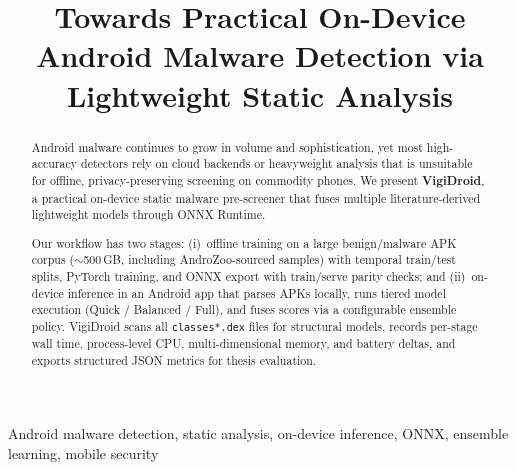 \documentclass[conference]{IEEEtran}
\begin{document}
	
	\title{Towards Practical On-Device Android Malware Detection via Lightweight Static Analysis}
	
	\author{
		\and
		\and
		\and
		\and
	}
	
	\maketitle
	
	\begin{abstract}
		Android malware continues to grow in volume and sophistication, yet most high-accuracy detectors rely on cloud backends or heavyweight analysis that is unsuitable for offline, privacy-preserving screening on commodity phones.
		We present \textbf{VigiDroid}, a practical on-device static malware pre-screener that fuses multiple literature-derived lightweight models through ONNX Runtime.
		
		Our workflow has two stages: (i)~offline training on a large benign/malware APK corpus ($\sim$500\,GB, including AndroZoo-sourced samples) with temporal train/test splits, PyTorch training, and ONNX export with train/serve parity checks; and (ii)~on-device inference in an Android app that parses APKs locally, runs tiered model execution (Quick / Balanced / Full), and fuses scores via a configurable ensemble policy.
		VigiDroid scans all \texttt{classes*.dex} files for structural models, records per-stage wall time, process-level CPU, multi-dimensional memory, and battery deltas, and exports structured JSON metrics for thesis evaluation.
	\end{abstract}
	
	\begin{IEEEkeywords}
		Android malware detection, static analysis, on-device inference, ONNX, ensemble learning, mobile security
	\end{IEEEkeywords}
	
\end{document}
